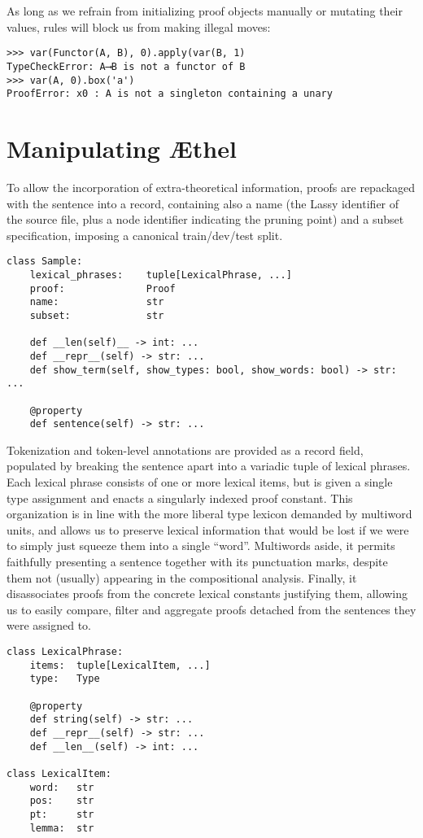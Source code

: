 \noindent As long as we refrain from initializing proof objects manually or mutating their values, rules will block us from making illegal moves:
\begin{verbatim}
>>> var(Functor(A, B), 0).apply(var(B, 1)
TypeCheckError: A⟶B is not a functor of B
>>> var(A, 0).box('a')
ProofError: x0 : A is not a singleton containing a unary
\end{verbatim}

\section{Manipulating \AE thel}
\label{subappendix:aethel}
To allow the incorporation of extra-theoretical information, proofs are repackaged with the sentence into a  record, containing also a name (the Lassy identifier of the source file, plus a node identifier indicating the pruning point) and a subset specification, imposing a canonical train/dev/test split.

\begin{verbatim}
class Sample:
    lexical_phrases:    tuple[LexicalPhrase, ...]
    proof:              Proof
    name:               str
    subset:             str

	def __len(self)__ -> int: ...
	def __repr__(self) -> str: ...
    def show_term(self, show_types: bool, show_words: bool) -> str: ...
    
    @property
    def sentence(self) -> str: ...
\end{verbatim}

\noindent Tokenization and token-level annotations are provided as a record field, populated by breaking the sentence apart into a variadic tuple of lexical phrases.
Each lexical phrase consists of one or more lexical items, but is given a single type assignment and enacts a singularly indexed proof constant.
This organization is in line with the more liberal type lexicon demanded by multiword units, and allows us to preserve lexical information that would be lost if we were to simply just squeeze them into a single ``word''.
Multiwords aside, it permits faithfully presenting a sentence together with its punctuation marks, despite them not (usually) appearing in the compositional analysis.
Finally, it disassociates proofs from the concrete lexical constants justifying them, allowing us to easily compare, filter and aggregate proofs detached from the sentences they were assigned to.

\begin{verbatim}
class LexicalPhrase:
    items:  tuple[LexicalItem, ...]
    type:   Type

    @property
    def string(self) -> str: ...
    def __repr__(self) -> str: ...
    def __len__(self) -> int: ...

class LexicalItem:
    word:   str
    pos:    str
    pt:     str
    lemma:  str
\end{verbatim}

